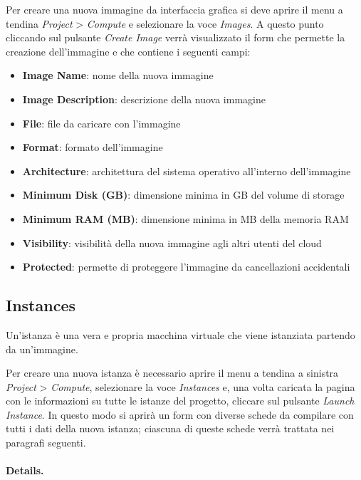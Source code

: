 Per creare una nuova immagine da interfaccia grafica si deve aprire il menu a tendina \textit{Project} > \textit{Compute} e selezionare la voce \textit{Images}. A questo punto cliccando sul pulsante \textit{Create Image} verrà visualizzato il form che permette la creazione dell'immagine e che contiene i seguenti campi:
\begin{itemize}
    \item \textbf{Image Name}: nome della nuova immagine
    \item \textbf{Image Description}: descrizione della nuova immagine
    \item \textbf{File}: file da caricare con l'immagine
    \item \textbf{Format}: formato dell'immagine
    \item \textbf{Architecture}: architettura del sistema operativo all'interno dell'immagine
    \item \textbf{Minimum Disk (GB)}: dimensione minima in GB del volume di storage
    \item \textbf{Minimum RAM (MB)}: dimensione minima in MB della memoria RAM
    \item \textbf{Visibility}: visibilità della nuova immagine agli altri utenti del cloud
    \item \textbf{Protected}: permette di proteggere l'immagine da cancellazioni accidentali
\end{itemize}

\subsection{Instances}\label{sec:openstack_usage_instances}

Un'istanza è una vera e propria macchina virtuale che viene istanziata partendo da un'immagine. 

Per creare una nuova istanza è necessario aprire il menu a tendina a sinistra \textit{Project} > \textit{Compute}, selezionare la voce \textit{Instances} e, una volta caricata la pagina con le informazioni su tutte le istanze del progetto, cliccare sul pulsante \textit{Launch Instance}. In questo modo si aprirà un form con diverse schede da compilare con tutti i dati della nuova istanza; ciascuna di queste schede verrà trattata nei paragrafi seguenti.

\paragraph{Details.}

